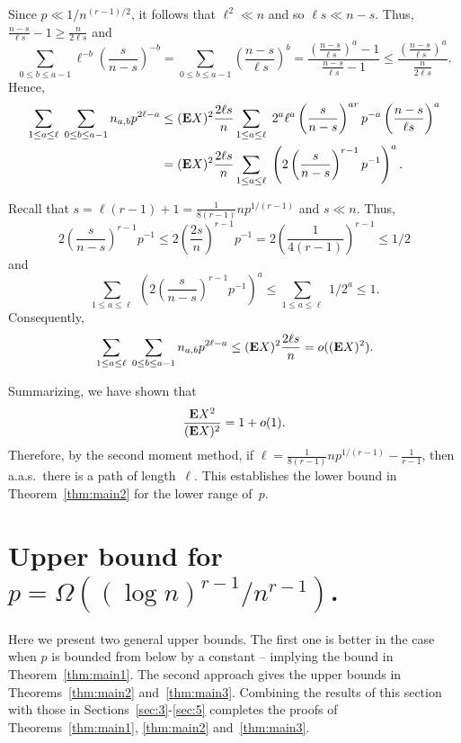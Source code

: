\documentclass[12pt,reqno]{amsart}
\theoremstyle{remark}
\def\E{\mbox{{\bf E}}}
\def\E{\mbox{{\bf E}}}
\begin{document}
Since $p \ll 1/n^{(r-1)/2}$, it follows that $\ell^2 \ll n$ and so $\ell s \ll n-s$. Thus, $\frac{n-s}{\ell s}-1 \ge \frac{n}{2\ell s}$ and
\[
\sum_{0\le b \le a-1}  \ell^{-b} \left(\frac{s}{n-s}\right)^{-b}
= \sum_{0\le b \le a-1}   \left(\frac{n-s}{\ell s}\right)^{b}
= \frac{\left(\frac{n-s}{\ell s}\right)^{a}-1}{\frac{n-s}{\ell s}-1}
\le \frac{\left(\frac{n-s}{\ell s}\right)^{a}}{\frac{n}{2\ell s}}.
\]
Hence,
\begin{align}
\sum_{1\le a \le \ell}\; \sum_{0\le b \le a-1} n_{a,b} p^{2\ell-a}
&\le (\E X)^2 \frac{2\ell s}{n} \sum_{1\le a \le \ell}\; 2^a\ell^{a} \left(\frac{s}{n-s}\right)^{ar} p^{-a} \left(\frac{n-s}{\ell s}\right)^{a}\notag\\
&= (\E X)^2 \frac{2\ell s}{n} \sum_{1\le a \le \ell}\; \left( 2\left(\frac{s}{n-s}\right)^{r-1} p^{-1} \right)^a.\label{eq:second_moment}
\end{align}

Recall that $s=\ell(r-1)+1 = \frac{1}{8(r-1)} np^{1/(r-1)}$ and $s\ll n$. Thus, 
\[
2\left(\frac{s}{n-s}\right)^{r-1} p^{-1} 
\le 2\left(\frac{2s}{n}\right)^{r-1} p^{-1} 
= 2\left(\frac{1}{4(r-1)}\right)^{r-1} \le 1/2
\]
and
\[
\sum_{1\le a \le \ell}\; \left(2 \left(\frac{s}{n-s}\right)^{r-1} p^{-1} \right)^a 
\le \sum_{1\le a \le \ell}\; 1/2^a \le 1.
\]
Consequently,
\[
\sum_{1\le a \le \ell}\; \sum_{0\le b \le a-1} n_{a,b} p^{2\ell-a} \le (\E X)^2 \frac{2\ell s}{n} = o((\E X)^2).
\]

Summarizing, we have shown that 
\[
\frac{\E X^2}{(\E X)^2} = 1+o(1).
\]
Therefore, by the second moment method, if $\ell =  \frac{1}{8(r-1)}np^{1/(r-1)}-\frac{1}{r-1}$, then a.a.s.\ there is a path of length~$\ell$. This establishes the lower bound in Theorem~\ref{thm:main2} for the lower range of~$p$.


\section{Upper bound for $p=\Omega((\log n)^{r-1}/n^{r-1})$.}\label{sec:6}

Here we present two general upper bounds. The first one is better in the case when $p$ is bounded from below by a constant -- implying the bound in Theorem~\ref{thm:main1}. The second approach gives the upper bounds in Theorems~\ref{thm:main2} and~\ref{thm:main3}.
Combining the results of this section with those in Sections~\ref{sec:3}-\ref{sec:5} completes the proofs of Theorems~\ref{thm:main1}, \ref{thm:main2} and~\ref{thm:main3}.
\end{document}
